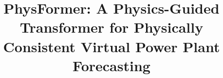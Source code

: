 \documentclass[preprint,review,12pt]{elsarticle}
\begin{document}
\begin{frontmatter}

\title{PhysFormer: A Physics-Guided Transformer for Physically Consistent Virtual Power Plant Forecasting}



\begin{keyword}

\end{keyword}

\end{frontmatter}








\end{document}
